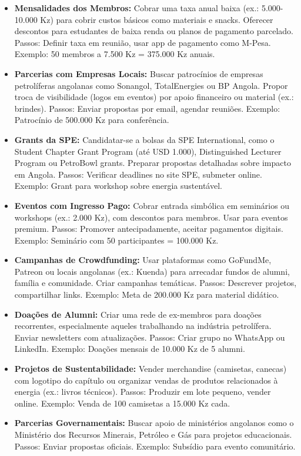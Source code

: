 \documentclass[12pt]{article}
\begin{document}
\begin{itemize}
    \item \textbf{Mensalidades dos Membros:} Cobrar uma taxa anual baixa (ex.: 5.000-10.000 Kz) para cobrir custos básicos como materiais e snacks. Oferecer descontos para estudantes de baixa renda ou planos de pagamento parcelado. Passos: Definir taxa em reunião, usar app de pagamento como M-Pesa. Exemplo: 50 membros a 7.500 Kz = 375.000 Kz anuais.
    \item \textbf{Parcerias com Empresas Locais:} Buscar patrocínios de empresas petrolíferas angolanas como Sonangol, TotalEnergies ou BP Angola. Propor troca de visibilidade (logos em eventos) por apoio financeiro ou material (ex.: brindes). Passos: Enviar propostas por email, agendar reuniões. Exemplo: Patrocínio de 500.000 Kz para conferência.
    \item \textbf{Grants da SPE:} Candidatar-se a bolsas da SPE International, como o Student Chapter Grant Program (até USD 1.000), Distinguished Lecturer Program ou PetroBowl grants. Preparar propostas detalhadas sobre impacto em Angola. Passos: Verificar deadlines no site SPE, submeter online. Exemplo: Grant para workshop sobre energia sustentável.
    \item \textbf{Eventos com Ingresso Pago:} Cobrar entrada simbólica em seminários ou workshops (ex.: 2.000 Kz), com descontos para membros. Usar para eventos premium. Passos: Promover antecipadamente, aceitar pagamentos digitais. Exemplo: Seminário com 50 participantes = 100.000 Kz.
    \item \textbf{Campanhas de Crowdfunding:} Usar plataformas como GoFundMe, Patreon ou locais angolanas (ex.: Kuenda) para arrecadar fundos de alumni, família e comunidade. Criar campanhas temáticas. Passos: Descrever projetos, compartilhar links. Exemplo: Meta de 200.000 Kz para material didático.
    \item \textbf{Doações de Alumni:} Criar uma rede de ex-membros para doações recorrentes, especialmente aqueles trabalhando na indústria petrolífera. Enviar newsletters com atualizações. Passos: Criar grupo no WhatsApp ou LinkedIn. Exemplo: Doações mensais de 10.000 Kz de 5 alumni.
    \item \textbf{Projetos de Sustentabilidade:} Vender merchandise (camisetas, canecas) com logotipo do capítulo ou organizar vendas de produtos relacionados à energia (ex.: livros técnicos). Passos: Produzir em lote pequeno, vender online. Exemplo: Venda de 100 camisetas a 15.000 Kz cada.
    \item \textbf{Parcerias Governamentais:} Buscar apoio de ministérios angolanos como o Ministério dos Recursos Minerais, Petróleo e Gás para projetos educacionais. Passos: Enviar propostas oficiais. Exemplo: Subsídio para evento comunitário.

\end{itemize}
\end{document}
